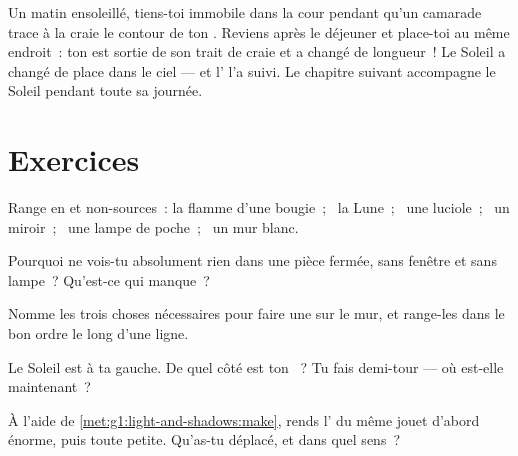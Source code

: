 \begin{example}\label{ex:g1:light-and-shadows:chalk}
Un matin ensoleillé, tiens-toi immobile dans la cour pendant qu'un
camarade trace à la craie le contour de ton . Reviens après le
déjeuner et place-toi au même endroit~: ton  est sortie de son
trait de craie et a changé de longueur~! Le Soleil a changé de place
dans le ciel --- et l' l'a suivi. Le chapitre suivant accompagne
le Soleil pendant toute sa journée.
\end{example}

\section{Exercices}

\begin{exercise}[$\star$]\label{exo:g1:light-and-shadows:1}
Range en  et non-sources~: la flamme d'une
bougie~; \ la Lune~; \ une luciole~; \ un miroir~; \ une lampe de
poche~; \ un mur blanc.
\end{exercise}

\begin{exercise}[$\star$]\label{exo:g1:light-and-shadows:2}
Pourquoi ne vois-tu absolument rien dans une pièce fermée, sans
fenêtre et sans lampe~? Qu'est-ce qui manque~?
\end{exercise}

\begin{exercise}[$\star$]\label{exo:g1:light-and-shadows:3}
Nomme les trois choses nécessaires pour faire une  sur le mur,
et range-les dans le bon ordre le long d'une ligne.
\end{exercise}

\begin{exercise}[$\star$]\label{exo:g1:light-and-shadows:4}
Le Soleil est à ta gauche. De quel côté est ton ~? Tu fais
demi-tour --- où est-elle maintenant~?
\end{exercise}

\begin{exercise}[$\star$]\label{exo:g1:light-and-shadows:5}
À l'aide de \cref{met:g1:light-and-shadows:make}, rends l' du
même jouet d'abord énorme, puis toute petite. Qu'as-tu déplacé, et
dans quel sens~?
\end{exercise}

